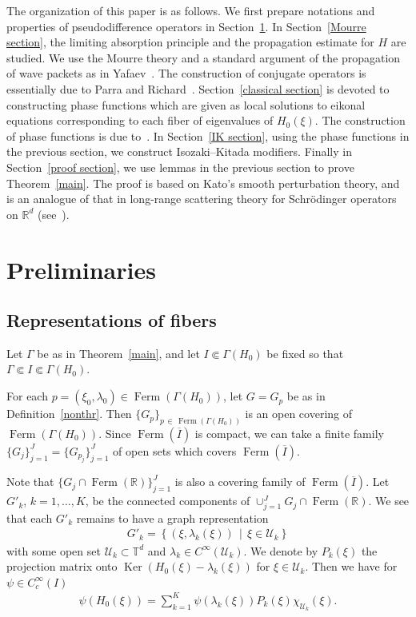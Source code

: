 \documentclass[10pt]{amsart}
\theoremstyle{definition}\newtheorem{defi}[theo]{Definition}\newtheorem{rema}[theo]{Remark}\newtheorem{exam}[theo]{Example}\newtheorem{exem}[theo]{Example}\newtheorem{nota}[theo]{Notation}
\newcommand{\Schr}{Schr\"odinger }
\newcommand{\ps}{\psi}
\renewcommand{\l}{\lambda}
\newcommand{\x}{\xi}
\newcommand{\R}{\mathbb{R}}
\newcommand{\T}{\mathbb{T}}
\newcommand{\US}{\mathcal{U}}
\DeclareMathOperator{\kerr}{Ker}
\DeclareMathOperator{\Ferm}{Ferm}
\begin{document}
The organization of this paper is as follows. We first prepare notations and properties of pseudodifference operators in Section~\ref{notations sec}. In Section~\ref{Mourre section}, the limiting absorption principle and the propagation estimate for $H$ are studied. We use the Mourre theory and a standard argument of the propagation of wave packets as in Yafaev~\cite[Chapter~10]{Y}. The construction of conjugate operators is essentially due to Parra and Richard~\cite{P-R}. Section~\ref{classical section} is devoted to constructing phase functions which are given as local solutions to eikonal equations corresponding to each fiber of eigenvalues of $H_0(\x)$. The construction of phase functions is due to~\cite{N3}. In Section~\ref{IK section}, using the phase functions in the previous section, we construct Isozaki--Kitada modifiers. Finally in Section~\ref{proof section}, we use lemmas in the previous section to prove Theorem~\ref{main}. The proof is based on Kato's smooth perturbation theory, and is an analogue of that in long-range scattering theory for \Schr operators on $\R^d$ (see~\cite{Y}).



\section{Preliminaries}\label{notations sec}



\subsection{Representations of fibers}

Let $\Gamma$ be as in Theorem~\ref{main}, and let $I \Subset \Gamma(H_0)$ be fixed so that $\Gamma \Subset I \Subset \Gamma(H_0)$.

For each $p=(\x_0,\l_0) \in \Ferm(\Gamma(H_0))$, let $G=G_p$ be as in Definition~\ref{nonthr}. Then $\{ G_p \}_{p\,\in\,\Ferm(\Gamma(H_0))}$ is an open covering of $\Ferm(\Gamma(H_0))$. Since $\Ferm(\overline{I})$ is compact, we can take a finite family $\{ G_{j} \}_{j=1}^J = \{ G_{p_j} \}_{j=1}^J$ of open sets which covers $\Ferm(\overline{I})$.

Note that $\{ G_j \cap \Ferm(\R) \}_{j=1}^J$ is also a covering family of $\Ferm(\overline{I})$. Let $G'_k$, $k=1,\dots,K$, be the connected components of $\cup_{j=1}^J G_j \cap \Ferm(\R)$. We see that each $G'_k$ remains to have a graph representation
\begin{align}\label{G_k representation}
G'_k=\left\{ (\x,\l_k(\x)) \,\middle|\, \x \in \US_k \right\}
\end{align}
with some open set $\US_k \subset \T^d$ and $\l_k\in C^\infty(\US_k)$. We denote by $P_k(\x)$ the projection matrix onto $\kerr (H_0(\x)-\l_k(\x))$ for $\x\in \US_k$. Then we have for $\psi\in C_c^\infty(I)$
\begin{align}\label{Rep of E_H0}
\ps(H_0(\x)) = \sum_{k=1}^K \ps(\l_k(\x)) P_k(\x) \chi_{\US_k}(\x).
\end{align}
\end{document}
